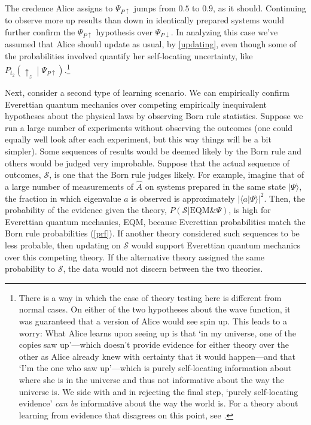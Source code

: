 \documentclass[onecolumn,secnumarabic,amsmath,amssymb,balancelastpage,nofootinbib]{article}
\begin{document}
The credence Alice assigns to $\Psi_{P\uparrow}$ jumps from $0.5$ to $0.9$, as it should.  Continuing to observe more up results than down in identically prepared systems would further confirm the $\Psi_{P\uparrow}$ hypothesis over $\Psi_{P\downarrow}$.   In analyzing this case we've assumed that Alice should update as usual, by \eqref{updating}, even though some of the probabilities involved quantify her self-locating uncertainty, like $P_{t_2}\left(\uparrow_z\middle|\Psi_{P\uparrow}\right)$.\footnote{There is a way in which the case of theory testing here is different from normal cases.  On either of the two hypotheses about the wave function, it was guaranteed that a version of Alice would see spin up.  This leads to a worry:  What Alice learns upon seeing up is that `in my universe, one of the copies saw up'---which doesn't provide evidence for either theory over the other as Alice already knew with certainty that it would happen---and that `I'm the one who saw up'---which is purely self-locating information about where she is in the universe and thus not informative about the way the universe is.  We {side} with \citet{titelbaum2008} and \citet[pp. 294-295]{greavesM} {in rejecting the final step,} `purely self-locating evidence' {\emph{can be} informative about the way the world is}.  For a theory about learning from evidence that disagrees on this point, see \citet{meacham2008}.}

Next, consider a second type of learning scenario.  We can empirically confirm Everettian quantum mechanics over competing empirically inequivalent hypotheses about the physical laws by observing Born rule statistics.  Suppose we run a large number of experiments without observing the outcomes (one could equally well look after each experiment, but this way things will be a bit simpler).  Some sequences of results would be deemed likely by the Born rule and others would be judged very improbable.  Suppose that the actual sequence of outcomes, $\mathscr{S}$, is one that the Born rule judges likely. {For example, imagine} that of a large number of measurements of $\widehat{A}$ on systems prepared in the same state $|\Psi\rangle$, the fraction in which eigenvalue $a$ is observed  is approximately $|\langle a|\Psi\rangle|^2$.  Then, the probability of the evidence given the theory, $P(\mathscr{S}|\text{EQM}\&\Psi)$, is high for Everettian quantum mechanics, EQM, because Everettian probabilities match the Born rule probabilities (\textsection \ref{prf}).  If another theory considered such sequences to be less probable, then updating on $\mathscr{S}$ would support Everettian quantum mechanics over this competing theory.  If the alternative theory assigned the same probability to $\mathscr{S}$, the data would not discern between the two theories.
\end{document}
